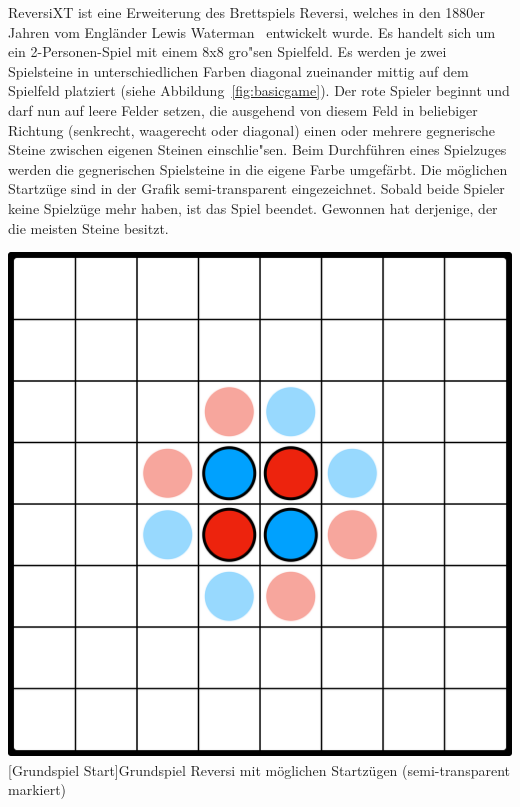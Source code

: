 ReversiXT ist eine Erweiterung des Brettspiels Reversi, welches in den 1880er Jahren vom Engl\"ander Lewis Waterman~\cite{ReversiInventor} entwickelt wurde.
Es handelt sich um ein 2-Personen-Spiel mit einem 8x8 gro"sen Spielfeld.
Es werden je zwei Spielsteine in unterschiedlichen Farben diagonal zueinander mittig auf dem Spielfeld platziert (siehe Abbildung~\ref{fig:basicgame}).
Der rote Spieler beginnt und darf nun auf leere Felder setzen, die ausgehend von diesem Feld in beliebiger Richtung (senkrecht, waagerecht oder diagonal) einen oder mehrere gegnerische Steine zwischen eigenen Steinen einschlie"sen.
Beim Durchf\"uhren eines Spielzuges werden die gegnerischen Spielsteine in die eigene Farbe umgef\"arbt.
Die m\"oglichen Startz\"uge sind in der Grafik semi-transparent eingezeichnet.
Sobald beide Spieler keine Spielz\"uge mehr haben, ist das Spiel beendet.
Gewonnen hat derjenige, der die meisten Steine besitzt.

\vspace{1em}
\begin{minipage}{\linewidth}
	\centering
	\includegraphics[width=0.5\linewidth]{pics/basicgame-start}
	[Grundspiel Start]{Grundspiel Reversi mit möglichen Startzügen (semi-transparent markiert)}
	\label{fig:basicgame}
\end{minipage}

